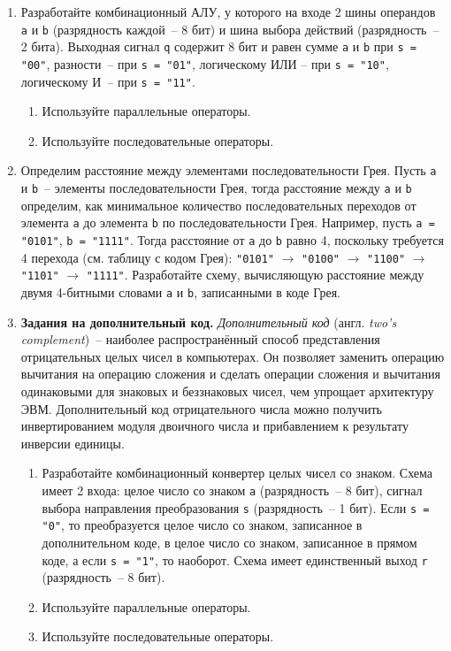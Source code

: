 \begin{enumerate}
\item Разработайте комбинационный АЛУ, у которого на входе 2 шины операндов \lstinline?a? и \lstinline?b? (разрядность каждой~-- 8 бит) и шина выбора действий (разрядность~-- 2 бита). Выходная сигнал \lstinline?q? содержит 8 бит и равен сумме \lstinline?a? и \lstinline?b? при \lstinline?s = "00"?, разности~-- при \lstinline?s = "01"?, логическому ИЛИ – при \lstinline?s = "10"?, логическому И~-- при \lstinline?s = "11"?.
    \begin{enumerate}
    \item Используйте параллельные операторы.
    \item Используйте последовательные операторы.
    \end{enumerate}
\item Определим расстояние между элементами последовательности Грея. Пусть \lstinline?a? и \lstinline?b?~-- элементы последовательности Грея, тогда расстояние между \lstinline?a? и \lstinline?b? определим, как минимальное количество последовательных переходов от элемента \lstinline?a? до элемента \lstinline?b? по последовательности Грея. Например, пусть \lstinline?a = "0101"?, \lstinline?b = "1111"?. Тогда расстояние от \lstinline?a? до \lstinline?b? равно 4, поскольку требуется 4 перехода (см. таблицу с кодом Грея): \lstinline?"0101"? $\rightarrow$ \lstinline?"0100"? $\rightarrow$ \lstinline?"1100"? $\rightarrow$ \lstinline?"1101"? $\rightarrow$ \lstinline?"1111"?. Разработайте схему, вычисляющую расстояние между двумя 4-битными словами \lstinline?a? и \lstinline?b?, записанными в коде Грея.
\item \textbf{Задания на дополнительный код.} \emph{Дополнительный код} (англ. \emph{two’s complement})~-- наиболее распространённый способ представления отрицательных целых чисел в компьютерах. Он позволяет заменить операцию вычитания на операцию сложения и сделать операции сложения и вычитания одинаковыми для знаковых и беззнаковых чисел, чем упрощает архитектуру ЭВМ. Дополнительный код отрицательного числа можно получить инвертированием модуля двоичного числа и прибавлением к результату инверсии единицы. 
    \begin{enumerate}
    \item Разработайте комбинационный конвертер целых чисел со знаком. Схема имеет 2 входа: целое число со знаком \lstinline?a? (разрядность~-- 8 бит), сигнал выбора направления преобразования \lstinline?s? (разрядность~-- 1 бит). Если \lstinline?s = "0"?, то преобразуется целое число со знаком, записанное в дополнительном коде, в целое число со знаком, записанное в прямом коде, а если \lstinline?s = "1"?, то наоборот. Схема имеет единственный выход \lstinline?r? (разрядность~-- 8 бит).
    \item Используйте параллельные операторы.
    \item Используйте последовательные операторы.
    \end{enumerate}
\end{enumerate}








